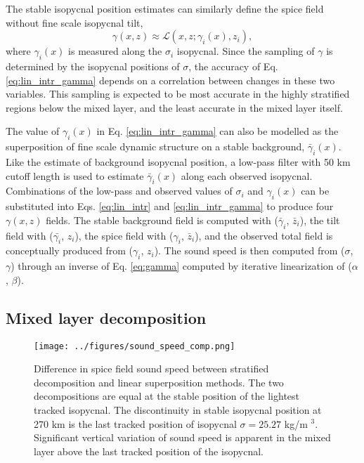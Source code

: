 \documentclass[preprint,NumberedRefs]{JASA}
\begin{document}
The stable isopycnal position estimates can similarly define the spice field without fine scale isopycnal tilt,
\begin{equation}
    \gamma(x, z)\approx\mathcal{L}(x, z; \gamma_i(x), z_i),
    \label{eq:lin_intr_gamma}
\end{equation}
where $\gamma_i(x)$ is measured along the $\sigma_i$ isopycnal. Since the sampling of $\gamma$ is determined by the isopycnal positions of $\sigma$, the accuracy of Eq. \eqref{eq:lin_intr_gamma} depends on a correlation between changes in these two variables. This sampling is expected to be most accurate in the highly stratified regions below the mixed layer, and the least accurate in the mixed layer itself.

The value of $\gamma_i(x)$ in Eq. \eqref{eq:lin_intr_gamma} can also be modelled as the superposition of fine scale dynamic structure on a stable background, $\bar{\gamma}_i(x)$. Like the estimate of background isopycnal position, a low-pass filter with 50 km cutoff length is used to estimate $\bar{\gamma}_i(x)$ along each observed isopycnal. Combinations of the low-pass and observed values of $\sigma_i$ and $\gamma_i(x)$ can be substituted into Eqs. \eqref{eq:lin_intr} and \eqref{eq:lin_intr_gamma} to produce four $\gamma(x,z)$ fields. The stable background field is computed with ($\bar{\gamma}_i$, $\bar{z}_i$), the tilt field with ($\bar{\gamma_i}$, $z_i$), the spice field with ($\gamma_i$, $\bar{z}_i$), and the observed total field is conceptually produced from ($\gamma_i$, $z_i$). The sound speed is then computed from ($\sigma$, $\gamma$) through an inverse of Eq. \eqref{eq:gamma} computed by iterative linearization of ($\alpha$, $\beta$).


\subsection{Mixed layer decomposition}\label{ssec:ml_decomp}
\begin{figure}
\texttt{[image: ../figures/sound\_speed\_comp.png]}
    \caption{\label{fig:c_diff}{Difference in spice field sound speed between stratified decomposition and linear superposition methods. The two decompositions are equal at the stable position of the lightest tracked isopycnal. The discontinuity in stable isopycnal position at 270 km is the last tracked position of isopycnal $\sigma=25.27$ kg/m $^3$. Significant vertical variation of sound speed is apparent in the mixed layer above the last tracked position of the isopycnal.}}
\end{figure}
\end{document}
